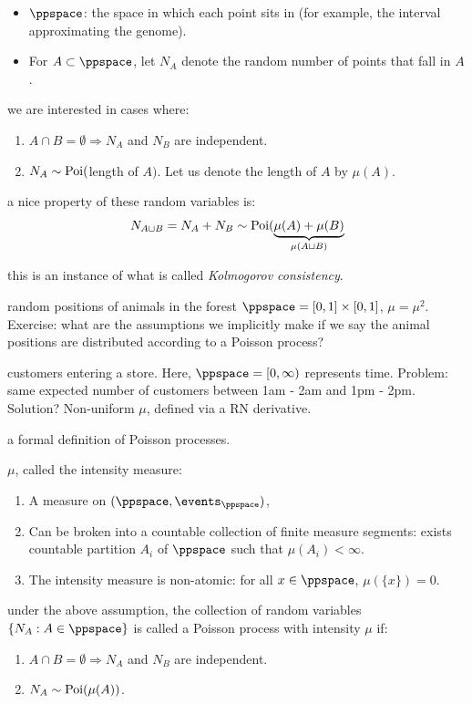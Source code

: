 \documentclass{article}
\begin{document}
\begin{itemize}
  \item $\ppspace$: the space in which each point sits in (for example, the interval approximating the genome).
  \item For $A \subset \ppspace$, let $N_A$ denote the random number of points that fall in $A$.
\end{itemize}

 we are interested in cases where:
\begin{enumerate}
  \item $A \cap B = \emptyset \Longrightarrow N_A$ and $N_B$ are independent.
  \item $N_A \sim \operatorname{Poi}($length of $A)$. Let us denote the length of $A$ by $\mu(A)$.
\end{enumerate}

 a nice property of these random variables is:
\[ N_{A\sqcup B} = N_A + N_B \sim \operatorname{Poi}(\underbrace{\mu(A) + \mu(B)}_{\mu(A\sqcup B)} \]

 this is an instance of what is called \emph{Kolmogorov consistency}.

 random positions of animals in the forest $\ppspace = [0,1]\times[0,1]$, $\mu = \mu^2$. Exercise: what are the assumptions we implicitly make if we say the animal positions are distributed according to a Poisson process?

 customers entering a store. Here, $\ppspace = [0, \infty)$ represents time. Problem: same expected number of customers between 1am - 2am and 1pm - 2pm. Solution? Non-uniform $\mu$, defined via a RN derivative. 

 a formal definition of Poisson processes. 

 $\mu$, called the intensity measure:
\begin{enumerate}
  \item A measure on $(\ppspace, \events_\ppspace)$,
  \item Can be broken into a countable collection of finite measure segments: exists countable partition $A_i$ of $\ppspace$ such that $\mu(A_i) < \infty$.
  \item The intensity measure is non-atomic: for all $x \in \ppspace$, $\mu(\{x\}) = 0$. 
\end{enumerate}

 under the above assumption, the collection of random variables $\{N_A : A \in \ppspace\}$ is called a Poisson process with intensity $\mu$ if:
\begin{enumerate}
  \item $A \cap B = \emptyset \Longrightarrow N_A$ and $N_B$ are independent.
  \item $N_A \sim \operatorname{Poi}(\mu(A))$.
\end{enumerate}
\end{document}
